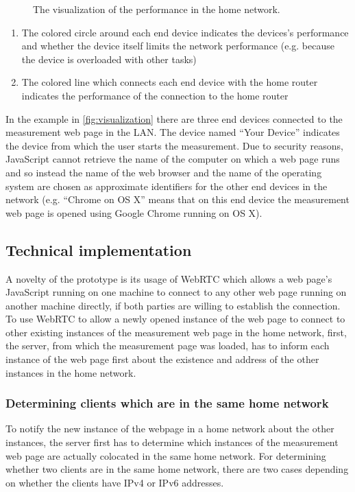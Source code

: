 \documentclass{sig-alternate-10pt}
\begin{document}
\begin{enumerate}
\begin{figure}[tbh]
\begin{center}
\end{center}
\caption{The visualization of the performance in the home network.}\label{fig:visualization}
\end{figure}
\begin{enumerate}
\item The colored circle around each end device indicates the devices's performance and whether the device itself limits the network performance (e.g. because the device is overloaded with other tasks)
\item The colored line which connects each end device with the home router indicates the performance of the connection to the home router
\end{enumerate}
In the example in \autoref{fig:visualization} there are three end devices connected to the measurement web page in the LAN. The device named ``Your Device'' indicates the device from which the user starts the measurement. Due to security reasons, JavaScript cannot retrieve the name of the computer on which a web page runs and so instead the name of the web browser and the name of the operating system are chosen as approximate identifiers for the other end devices in the network (e.g. ``Chrome on OS X'' means that on this end device the measurement web page is opened using Google Chrome running on OS X).
\end{enumerate}

\subsection{Technical implementation}

A novelty of the prototype is its usage of WebRTC which allows a web page's JavaScript running on one machine to connect to any other web page running on another machine directly, if both parties are willing to establish the connection. To use WebRTC to allow a newly opened instance of the web page to connect to other existing instances of the measurement web page in the home network, first, the server, from which the measurement page was loaded, has to inform each instance of the web page first about the existence and address of the other instances in the home network. 

\subsubsection{Determining clients which are in the same home network}

To notify the new instance of the webpage in a home network about the other instances, the server first has to determine which instances of the measurement web page are actually colocated in the same home network. For determining whether two clients are in the same home network, there are two cases depending on whether the clients have IPv4 or IPv6 addresses. 
\end{document}
